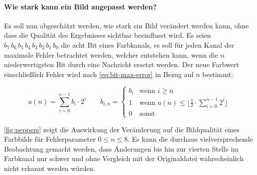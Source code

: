 \paragraph{Wie stark kann ein Bild angepasst werden?} \label{par:test}
Es soll nun abgeschätzt werden, wie stark ein Bild verändert
werden kann, ohne dass die Qualität des Ergebnisses sichtbar beeinflusst
wird. Es seien $b_7\,b_6\,b_5\,b_4\,b_3\,b_2\,b_1\,b_0$ die acht Bit eines Farbkanals, es soll für
jeden Kanal der maximale Fehler betrachtet werden, welcher entstehen kann,
wenn die $n$ niederwertigsten Bit durch eine Nachricht ersetzt werden.
Der neue Farbwert einschließlich Fehler wird nach \eqref{eq:bit-max-error} in Bezug auf $n$ bestimmt:

\begin{equation}
  a(n) = \sum_{i=0}^{n - 1} b_i \cdot 2^i \qquad
  b_{i, n} =
  \begin{cases}
    b_i & \text{wenn $i \geq n$}                                                           \\
    1   & \text{wenn $a(n) \leq \lfloor \frac{1}{2} \cdot \sum_{i=0}^{n - 1} 2^i$} \rfloor \\
    0   & \text{sonst}
  \end{cases}
  \label{eq:bit-max-error}
\end{equation}

\noindent
\autoref{fig:peppers} zeigt die Auswirkung der Veränderung auf die Bildqualität
eines Farbbilds für Fehlerparameter $0 \leq n \leq 8$.
Es kann die durchaus vielversprechende Beobachtung
gemacht werden, dass Änderungen bis hin zur vierten Stelle im Farbkanal nur schwer und
ohne Vergleich mit der Originaldatei wahrscheinlich nicht erkannt werden würden.
\newpage

